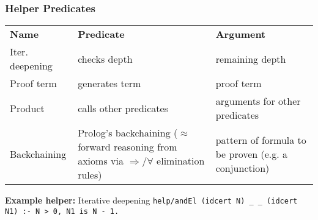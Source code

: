 \begin{frame}[fragile]
    \frametitle{Helper Predicates}
        \renewcommand{\arraystretch}{1.5}
    \begin{tabular}{l p{4cm} p{4.5cm}}
        \textbf{Name} & \textbf{Predicate} & \textbf{Argument} \\
        Iter. deepening & checks depth & remaining depth \\
        Proof term & generates term & proof term \\
        Product & calls other predicates & arguments for other predicates \\
        Backchaining &
            \footnotesize Prolog's backchaining ($\approx$ forward reasoning from axioms via $\Rightarrow$/$\forall$ elimination rules) &
            \footnotesize pattern of formula to be proven (e.g. a conjunction) \\
    \end{tabular}

    \vspace{1.5em}
    \begin{block}{\textbf{Example helper:} Iterative deepening}
        \lstinline[language=ELPI,keepspaces=true]|help/andEl (idcert N) _ _ (idcert N1) :- N > 0, N1 is N - 1.|
    \end{block}

% 
\end{frame}

